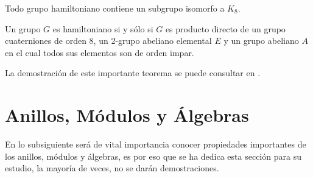 \begin{lema}
Todo grupo hamiltoniano contiene un subgrupo isomorfo a $K_8$.
\end{lema}
\begin{teorema}\label{teo:abelianohamiltoniano}
Un grupo $G$ es hamiltoniano si y sólo si $G$ es producto directo de un grupo cuaterniones de orden 8, un 2-grupo abeliano elemental $E$ y un grupo abeliano $A$ en el cual todos sus elementos son de orden impar.
\end{teorema}
La demostración de este importante teorema se puede consultar en \cite[p.130]{bib:groupBook}.
\section{Anillos, Módulos y Álgebras}
En lo subsiguiente será de vital importancia conocer propiedades importantes de los anillos, módulos y álgebras, es por eso que se ha dedica esta sección para su estudio, la mayoría de veces, no se darán demostraciones.
